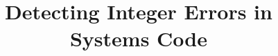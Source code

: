 \documentclass{article}
\begin{document}
\title{Detecting Integer Errors in Systems Code}
\author{}
\date{}
\maketitle












\end{document}
